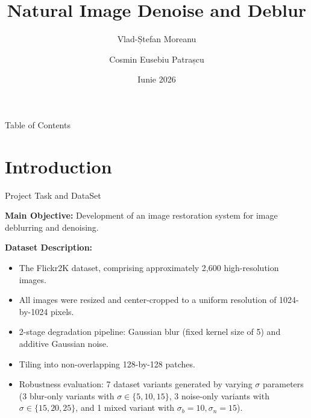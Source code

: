 \documentclass[10pt, handout]{beamer}
\begin{document}
\title{Natural Image Denoise and Deblur}
\author{
Vlad-Ștefan Moreanu \and 
Cosmin Eusebiu Patrașcu
}
\date{Iunie 2026}

\maketitle

\begin{frame}{Table of Contents}
    \tableofcontents
\end{frame}

\section{Introduction}
\begin{frame}{Project Task and DataSet}

\textbf{Main Objective:} Development of an image restoration system for image deblurring and denoising.

\vspace{10pt}
\textbf{Dataset Description:}
\begin{itemize}
    \item The Flickr2K dataset, comprising approximately 2,600 high-resolution images.
    \item All images were resized and center-cropped to a uniform resolution of 1024-by-1024 pixels.
    \item 2-stage degradation pipeline: Gaussian blur (fixed kernel size of 5) and additive Gaussian noise.
    \item Tiling into non-overlapping 128-by-128 patches.
    \item Robustness evaluation: 7 dataset variants generated by varying $\sigma$ parameters (3 blur-only variants with $\sigma \in \{5, 10, 15\}$, 3 noise-only variants with $\sigma \in \{15, 20, 25\}$, and 1 mixed variant with $\sigma_b = 10, \sigma_n = 15$).
\end{itemize}

\end{frame}
\end{document}
